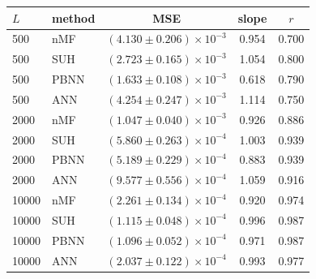 \begin{tabular}{llccc}
\hline\hline
$L$ & method & MSE & slope & $r$\\
\hline
500 & nMF & $(4.130\pm0.206){\times}10^{-3}$ & 0.954 & 0.700\\
500 & SUH & $(2.723\pm0.165){\times}10^{-3}$ & 1.054 & 0.800\\
500 & PBNN & $(1.633\pm0.108){\times}10^{-3}$ & 0.618 & 0.790\\
500 & ANN & $(4.254\pm0.247){\times}10^{-3}$ & 1.114 & 0.750\\
2000 & nMF & $(1.047\pm0.040){\times}10^{-3}$ & 0.926 & 0.886\\
2000 & SUH & $(5.860\pm0.263){\times}10^{-4}$ & 1.003 & 0.939\\
2000 & PBNN & $(5.189\pm0.229){\times}10^{-4}$ & 0.883 & 0.939\\
2000 & ANN & $(9.577\pm0.556){\times}10^{-4}$ & 1.059 & 0.916\\
10000 & nMF & $(2.261\pm0.134){\times}10^{-4}$ & 0.920 & 0.974\\
10000 & SUH & $(1.115\pm0.048){\times}10^{-4}$ & 0.996 & 0.987\\
10000 & PBNN & $(1.096\pm0.052){\times}10^{-4}$ & 0.971 & 0.987\\
10000 & ANN & $(2.037\pm0.122){\times}10^{-4}$ & 0.993 & 0.977\\
\hline\hline
\end{tabular}
